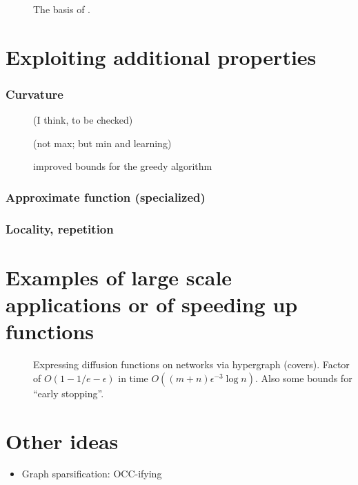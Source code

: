 \documentclass{article}
\begin{document}
\begin{description}
\item[\citet{badan14}] The basis of \cite{wei14}. 
\end{description}

\section{Exploiting additional properties}

\subsubsection{Curvature}
\begin{description}
\item[\citet{sviridenko13}]
\item[\citet{wei14}] (I think, to be checked)
\item[\citet{iyer13curv}] (not max; but min and learning)
\item[\citet{conforti84}] improved bounds for the greedy algorithm
\item[\citet{vondrak10}] 
\end{description}

\subsubsection{Approximate function (specialized)}
\begin{description}
\item[\citet{borgs14}] 
\end{description}

\subsubsection{Locality, repetition}
\begin{description}
\item[\citet{Mirzasoleiman2013}] 
\end{description}


\section{Examples of large scale applications or of speeding up functions}

\begin{description}
\item[\citet{borgs14}] Expressing diffusion functions on networks via hypergraph (covers). Factor of $O(1 - 1/e - \epsilon)$ in time $O((m+n)\epsilon^{-3} \log n)$. Also some bounds for ``early stopping''.
\end{description}




\section{Other ideas}

\begin{itemize}
\item Graph sparsification: OCC-ifying \citet{kelner11}
\end{itemize}




\end{document}
